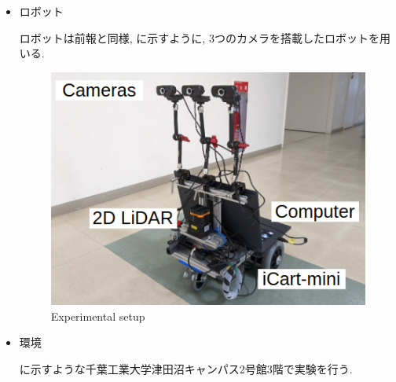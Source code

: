 \begin{itemize}
  \item ロボット
  
  ロボットは前報\cite{okada1}と同様, に示すように, 3つのカメラを搭載したロボットを用いる.

  
  \begin{figure}[hbtp]
    \centering
   \includegraphics[keepaspectratio, scale=0.7]
        {images/gamma3.png}
   \caption{Experimental setup}
   \label{Fig:gamma}
  \end{figure}

  \newpage

  \item 環境

  に示すような千葉工業大学津田沼キャンパス2号館3階で実験を行う.


\end{itemize}

